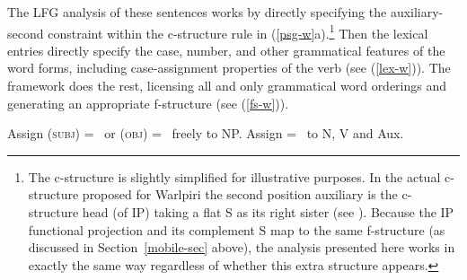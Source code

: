 The LFG analysis of these sentences works by directly specifying the auxiliary-second constraint within the c-structure rule in (\ref{psg-w}a).\footnote{The c-structure is slightly simplified for illustrative purposes. In the actual c-structure proposed for Warlpiri the second position auxiliary is the c-structure head (of IP) taking a flat S as its right sister (see \citealt[225]{austin+bresnan:1996}).  Because the IP functional projection and its complement S map to the same f-structure (as discussed in Section~\ref{mobile-sec} above),  the analysis presented here works in exactly the same way regardless of whether this extra structure appears.}  Then the lexical entries directly specify the case, number, and other grammatical features of the word forms, including case-assignment properties of the verb (see (\ref{lex-w})).  The framework does the rest, licensing all and only grammatical word orderings and generating an appropriate f-structure (see (\ref{fs-w})).

\eal  \label{psg-w}
\ex
{
}

\ex 
{
}
\zl


\eal  \label{ann-w}
\ex
{ Assign (\up \textsc{subj}) = \down\ or (\up \textsc{obj}) = \down\ freely to NP.
\ex 
{ Assign \up = \down\ to N, V and Aux.} }
\zl


\eal \label{lex-w} 
\ex 
{\qquad{}}

\ex 
{\qquad{}}

\ex 
{\qquad{}}

\ex 
{\qquad{}}
    
